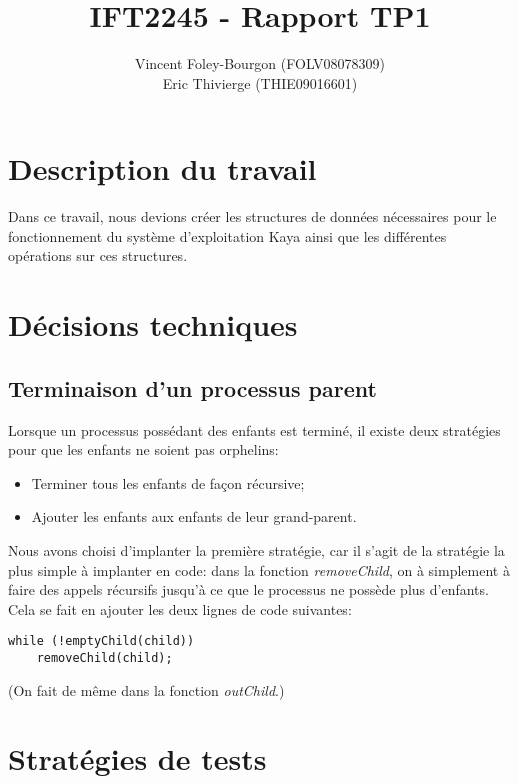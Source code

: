 \documentclass[10pt]{article}
\begin{document}
\title{IFT2245 - Rapport TP1}
\author{Vincent Foley-Bourgon (FOLV08078309) \\
Eric Thivierge (THIE09016601)}
\maketitle

\section{Description du travail}

Dans ce travail, nous devions créer les structures de données
nécessaires pour le fonctionnement du système d'exploitation Kaya
ainsi que les différentes opérations sur ces structures.


\section{Décisions techniques}

\subsection{Terminaison d'un processus parent}

Lorsque un processus possédant des enfants est terminé, il existe deux
stratégies pour que les enfants ne soient pas orphelins:

\begin{itemize}
\item Terminer tous les enfants de façon récursive;
\item Ajouter les enfants aux enfants de leur grand-parent.
\end{itemize}

Nous avons choisi d'implanter la première stratégie, car il s'agit de
la stratégie la plus simple à implanter en code: dans la fonction
\emph{removeChild}, on à simplement à faire des appels récursifs
jusqu'à ce que le processus ne possède plus d'enfants.  Cela se fait
en ajouter les deux lignes de code suivantes:

\begin{verbatim}
while (!emptyChild(child))
    removeChild(child);
\end{verbatim}

(On fait de même dans la fonction \emph{outChild}.)


\section{Stratégies de tests}
\end{document}
